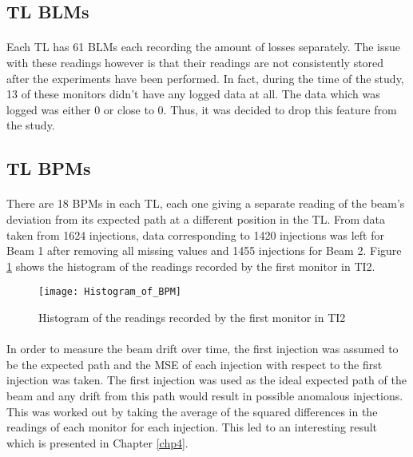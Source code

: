 \subsection{\acs{TL} \acs{BLM}s}
\label{subsec::TLBLM}
\paragraph{ }Each \acs{TL} has 61 \acs{BLM}s each recording the amount of losses separately. The issue with these readings however is that their readings are not consistently stored after the experiments have been performed. In fact, during the time of the study, 13 of these monitors didn't have any logged data at all. The data which was logged was either 0 or close to 0. Thus, it was decided to drop this feature from the study.   

\subsection{\acs{TL} \acs{BPM}s}
\paragraph{ }There are 18 \acs{BPM}s in each \acs{TL}, each one giving a separate reading of the beam's deviation from its expected path at a different position in the \acs{TL}. From data taken from 1624 injections, data corresponding to 1420 injections was left for Beam 1 after removing all missing values and 1455 injections for Beam 2. Figure \ref{fig::BPM_hist} shows the histogram of the readings recorded by the first monitor in TI2.

\begin{figure}[b]
	\centering
	\texttt{[image: Histogram\_of\_BPM]}
	\caption[BPM Histogram]{Histogram of the readings recorded by the first monitor in TI2}
	\label{fig::BPM_hist}
\end{figure} 

\paragraph{ }In order to measure the beam drift over time, the first injection was assumed to be the expected path and the \acs{MSE} of each injection with respect to the first injection was taken. The first injection was used as the ideal expected path of the beam and any drift from this path would result in possible anomalous injections. This was worked out by taking the average of the squared differences in the readings of each monitor for each injection. This led to an interesting result which is presented in Chapter \ref{chp4}.

